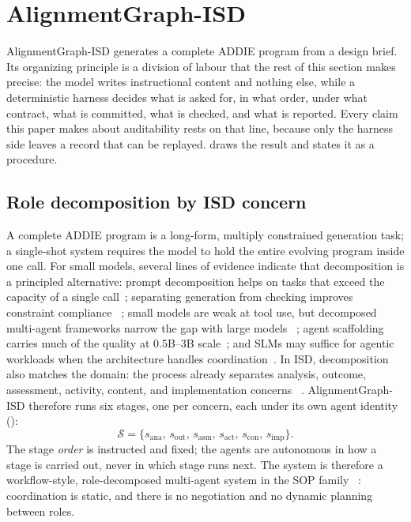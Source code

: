 \section{AlignmentGraph-ISD}
\label{sec:method}

AlignmentGraph-ISD generates a complete ADDIE program from a design brief. Its
organizing principle is a division of labour that the rest of this section makes
precise: the model writes instructional content and nothing else, while a
deterministic harness decides what is asked for, in what order, under what
contract, what is committed, what is checked, and what is reported. Every claim
this paper makes about auditability rests on that line, because only the harness
side leaves a record that can be replayed.  draws the
result and  states it as a procedure.

\subsection{Role decomposition by ISD concern}
\label{sec:decomposition}

A complete ADDIE program is a long-form, multiply constrained generation task; a
single-shot system requires the model to hold the entire evolving program inside
one call. For small models, several lines of evidence indicate that decomposition
is a principled alternative: prompt decomposition helps on tasks that exceed the
capacity of a single call~\cite{zhou2023leasttomost,khot2023decomposed};
separating generation from checking improves constraint compliance
~\cite{ferraz2024decrim}; small models are weak at tool use, but decomposed
multi-agent frameworks narrow the gap with large models
~\cite{shen2024multillmagent}; agent scaffolding carries much of the quality at
0.5B--3B scale~\cite{kang2025agentdistill}; and SLMs may suffice for agentic
workloads when the architecture handles coordination~\cite{belcak2025slm}. In ISD,
decomposition also matches the domain: the process already separates
analysis, outcome, assessment, activity, content, and implementation concerns
~\cite{branch2009addie}. AlignmentGraph-ISD therefore runs six stages, one per
concern, each under its own agent identity ():
\[
\mathcal{S}=\{s_{\mathrm{ana}},\,s_{\mathrm{out}},\,s_{\mathrm{asm}},\,
s_{\mathrm{act}},\,s_{\mathrm{con}},\,s_{\mathrm{imp}}\}.
\]
The stage \emph{order} is instructed and fixed; the agents are autonomous in how a
stage is carried out, never in which stage runs next. The system is therefore a
workflow-style, role-decomposed multi-agent system in the SOP family
~\cite{hong2024metagpt}: coordination is static, and there is no negotiation and no
dynamic planning between roles.

